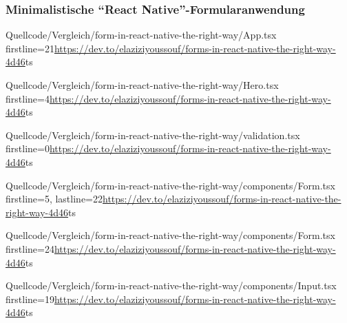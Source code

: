\clearpage
\subsubsection{Minimalistische \enquote{React Native}-Formularanwendung}

\begin{fremdeslisting}{}{}
  {Quellcode/Vergleich/form-in-react-native-the-right-way/App.tsx}
  {firstline=21}{\url{https://dev.to/elaziziyoussouf/forms-in-react-native-the-right-way-4d46}}{ts}
  \label{lst:Schritt1KlasseLetzterStatus}
\end{fremdeslisting}

\begin{fremdeslisting}{}{}
  {Quellcode/Vergleich/form-in-react-native-the-right-way/Hero.tsx}
  {firstline=4}{\url{https://dev.to/elaziziyoussouf/forms-in-react-native-the-right-way-4d46}}{ts}
  \label{lst:Schritt1KlasseLetzterStatus}
\end{fremdeslisting}

\begin{fremdeslisting}{}{}
  {Quellcode/Vergleich/form-in-react-native-the-right-way/validation.tsx}
  {firstline=0}{\url{https://dev.to/elaziziyoussouf/forms-in-react-native-the-right-way-4d46}}{ts}
  \label{lst:Schritt1KlasseLetzterStatus}
\end{fremdeslisting}
 
\begin{fremdeslisting}{}{}
  {Quellcode/Vergleich/form-in-react-native-the-right-way/components/Form.tsx}
  {firstline=5, lastline=22}{\url{https://dev.to/elaziziyoussouf/forms-in-react-native-the-right-way-4d46}}{ts}
  \label{lst:Schritt1KlasseLetzterStatus}
\end{fremdeslisting}

\begin{fremdeslisting}{}{}
	{Quellcode/Vergleich/form-in-react-native-the-right-way/components/Form.tsx}
	{firstline=24}{\url{https://dev.to/elaziziyoussouf/forms-in-react-native-the-right-way-4d46}}{ts}
	\label{lst:Schritt1KlasseLetzterStatus}
\end{fremdeslisting}

\begin{fremdeslisting}{}{}
  {Quellcode/Vergleich/form-in-react-native-the-right-way/components/Input.tsx}
  {firstline=19}{\url{https://dev.to/elaziziyoussouf/forms-in-react-native-the-right-way-4d46}}{ts}
  \label{lst:Schritt1KlasseLetzterStatus}
\end{fremdeslisting}
 